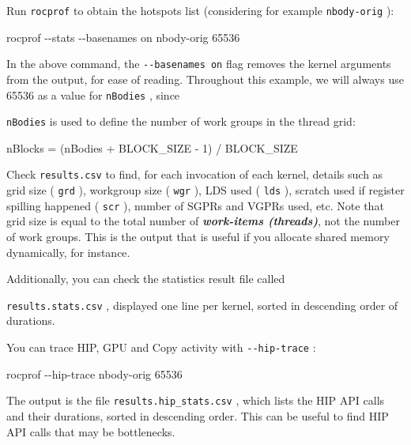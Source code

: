 \documentclass[
]{article}
\let\oldtexttt\texttt
\renewcommand{\texttt}[1]{
  \colorbox{Light}{\oldtexttt{#1}}
}
\newenvironment{Shaded}{}{}
\newcommand{\ExtensionTok}[1]{#1}
\newcommand{\NormalTok}[1]{#1}
\begin{document}
Run \texttt{rocprof} to obtain the hotspots list (considering for
example \texttt{nbody-orig}):

\begin{Shaded}
\begin{Highlighting}[]
\ExtensionTok{rocprof}\NormalTok{ {-}{-}stats {-}{-}basenames on nbody{-}orig 65536}
\end{Highlighting}
\end{Shaded}

In the above command, the \texttt{-\/-basenames\ on} flag removes the
kernel arguments from the output, for ease of reading. Throughout this
example, we will always use 65536 as a value for \texttt{nBodies}, since
\texttt{nBodies} is used to define the number of work groups in the
thread grid:

\begin{Shaded}
\begin{Highlighting}[]
\ExtensionTok{nBlocks}\NormalTok{ = (nBodies + BLOCK\_SIZE {-} 1) }\ExtensionTok{/}\NormalTok{ BLOCK\_SIZE}
\end{Highlighting}
\end{Shaded}

Check \texttt{results.csv} to find, for each invocation of each kernel,
details such as grid size (\texttt{grd}), workgroup size (\texttt{wgr}),
LDS used (\texttt{lds}), scratch used if register spilling happened
(\texttt{scr}), number of SGPRs and VGPRs used, etc. Note that grid size
is equal to the total number of \textbf{\emph{work-items (threads)}},
not the number of work groups. This is the output that is useful if you
allocate shared memory dynamically, for instance.

Additionally, you can check the statistics result file called
\texttt{results.stats.csv}, displayed one line per kernel, sorted in
descending order of durations.

You can trace HIP, GPU and Copy activity with \texttt{-\/-hip-trace}:

\begin{Shaded}
\begin{Highlighting}[]
\ExtensionTok{rocprof}\NormalTok{ {-}{-}hip{-}trace nbody{-}orig 65536}
\end{Highlighting}
\end{Shaded}

The output is the file \texttt{results.hip\_stats.csv}, which lists the
HIP API calls and their durations, sorted in descending order. This can
be useful to find HIP API calls that may be bottlenecks.
\end{document}
